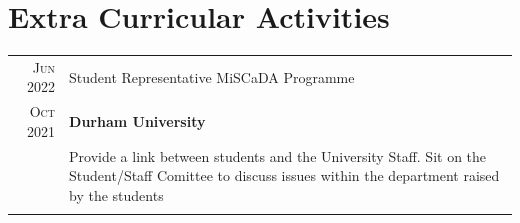 \documentclass[a4paper,10pt]{article} %
\begin{document}
\section{Extra Curricular Activities}
\bigskip
\begin{tabular}{r|p{11cm}}
	\textsc{Jun 2022} & Student Representative MiSCaDA Programme\\
	\textsc{Oct 2021}&\footnotesize{\textbf{Durham University}}\\
	&\footnotesize{Provide a link between students and the University Staff. Sit on the Student/Staff Comittee to discuss issues within the department raised by the students}\\
	\multicolumn{2}{c}{} \\
\end{tabular}

\end{document}
